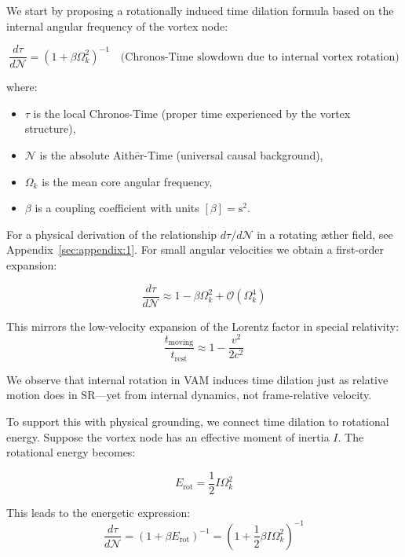 \documentclass[preprint]{revtex4-2}
\begin{document}
We start by proposing a rotationally induced time dilation formula based on the internal angular frequency of the vortex node:

\begin{equation}
    \frac{d\tau}{d\mathcal{N}} = \left(1 + \beta \Omega_k^2 \right)^{-1}
    \quad \text{(Chronos-Time slowdown due to internal vortex rotation)}
    \label{eq:chronos_swirl_slowdown}
\end{equation}

where:

\begin{itemize}
    \item $\tau$ is the local Chronos-Time (proper time experienced by the vortex structure),
    \item $\mathcal{N}$ is the absolute Aithēr-Time (universal causal background),
    \item $\Omega_k$ is the mean core angular frequency,
    \item $\beta$ is a coupling coefficient with units $[\beta] = \mathrm{s}^2$.
\end{itemize}
For a physical derivation of the relationship \( d\tau/d\mathcal{N} \) in a rotating æther field, see Appendix~\ref{sec:appendix:1}.
For small angular velocities we obtain a first-order expansion:

\begin{equation}
    \frac{d\tau}{d\mathcal{N}} \approx 1 - \beta \Omega_k^2 + \mathcal{O}(\Omega_k^4)
\end{equation}

This mirrors the low-velocity expansion of the Lorentz factor in special relativity:
\begin{equation}
    \frac{t_\text{moving}}{t_\text{rest}} \approx 1 - \frac{v^2}{2c^2}
\end{equation}

We observe that internal rotation in VAM induces time dilation just as relative motion does in SR—yet from internal dynamics, not frame-relative velocity.

To support this with physical grounding, we connect time dilation to rotational energy. Suppose the vortex node has an effective moment of inertia $I$. The rotational energy becomes:

\begin{equation}
    E_\text{rot} = \frac{1}{2} I \Omega_k^2
\end{equation}

This leads to the energetic expression:
\begin{equation}
    \frac{d\tau}{d\mathcal{N}} = \left(1 + \beta E_\text{rot} \right)^{-1}
    = \left(1 + \frac{1}{2} \beta I \Omega_k^2 \right)^{-1}
\end{equation}
\end{document}
